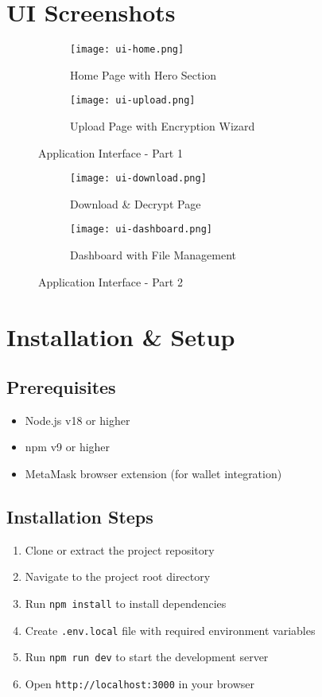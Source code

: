 \section{UI Screenshots}
\begin{figure}[H]
  \centering
  \begin{subfigure}{0.48\textwidth}
    \centering
    \texttt{[image: ui-home.png]}
    \caption{Home Page with Hero Section}
  \end{subfigure}\hfill
  \begin{subfigure}{0.48\textwidth}
    \centering
    \texttt{[image: ui-upload.png]}
    \caption{Upload Page with Encryption Wizard}
  \end{subfigure}
  \caption{Application Interface - Part 1}
\end{figure}

\begin{figure}[H]
  \centering
  \begin{subfigure}{0.48\textwidth}
    \centering
    \texttt{[image: ui-download.png]}
    \caption{Download & Decrypt Page}
  \end{subfigure}\hfill
  \begin{subfigure}{0.48\textwidth}
    \centering
    \texttt{[image: ui-dashboard.png]}
    \caption{Dashboard with File Management}
  \end{subfigure}
  \caption{Application Interface - Part 2}
\end{figure}

\section{Installation & Setup}
\subsection*{Prerequisites}
\begin{itemize}
  \item Node.js v18 or higher
  \item npm v9 or higher
  \item MetaMask browser extension (for wallet integration)
\end{itemize}

\subsection*{Installation Steps}
\begin{enumerate}
  \item Clone or extract the project repository
  \item Navigate to the project root directory
  \item Run \texttt{npm install} to install dependencies
  \item Create \texttt{.env.local} file with required environment variables
  \item Run \texttt{npm run dev} to start the development server
  \item Open \texttt{http://localhost:3000} in your browser
\end{enumerate}


